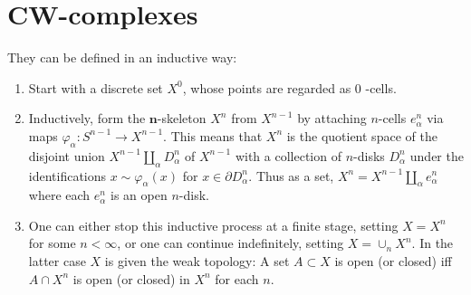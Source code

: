 \documentclass{book}
\begin{document}
\section{CW-complexes}

They can be defined in an inductive way:

\begin{enumerate}
    \item Start with a discrete set $X^0$, whose points are regarded as 0 -cells.
    \item Inductively, form the $\boldsymbol{n}$-skeleton $X^n$ from $X^{n-1}$ by attaching $n$-cells $e_\alpha^n$ via maps $\varphi_\alpha: S^{n-1} \rightarrow X^{n-1}$. This means that $X^n$ is the quotient space of the disjoint union $X^{n-1} \amalg_\alpha D_\alpha^n$ of $X^{n-1}$ with a collection of $n$-disks $D_\alpha^n$ under the identifications $x \sim \varphi_\alpha(x)$ for $x \in \partial D_\alpha^n$. Thus as a set, $X^n=X^{n-1} \amalg_\alpha e_\alpha^n$ where each $e_\alpha^n$ is an open $n$-disk.
    \item One can either stop this inductive process at a finite stage, setting $X=X^n$ for some $n<\infty$, or one can continue indefinitely, setting $X=\cup_n X^n$. In the latter case $X$ is given the weak topology: A set $A \subset X$ is open (or closed) iff $A \cap X^n$ is open (or closed) in $X^n$ for each $n$.
    
\end{enumerate}
\end{document}
